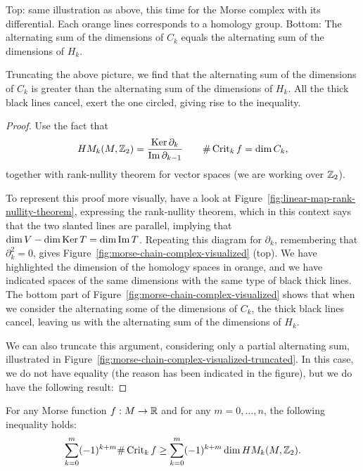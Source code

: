 \begin{marginfigure}
    \centering
    \caption{
        Top: same illustration as above, this time for the Morse complex with its differential.
        Each orange lines corresponds to a homology group.
        Bottom: The alternating sum of the dimensions of $C_k$ equals the alternating sum of the dimensions of $H_k$.
    }
    \label{fig:morse-chain-complex-visualized}
\end{marginfigure}
\begin{marginfigure}
    \centering
    \caption{Truncating the above picture, we find that the alternating sum of the dimensions of $C_k$ is greater than the alternating sum of the dimensions of  $H_k$. All the thick black lines cancel, exert the one circled, giving rise to the inequality.
    }
    \label{fig:morse-chain-complex-visualized-truncated}
\end{marginfigure}
\begin{proof}
    Use the fact that 
    \[
        \HMf[k]{M, \Z_2} = \frac{\Ker \partial_k}{\Im \partial_{k-1}} \qquad \# \Crit_k f = \dim C_k,
    \]
    together with rank-nullity theorem for vector spaces (we are working over $\Z_2$).

    To represent this proof more visually, have a look at Figure~\ref{fig:linear-map-rank-nullity-theorem}, expressing the rank-nullity theorem, which in this context says that the two slanted lines are parallel, implying that $\dim V - \dim \Ker T = \dim \Im T$.
    Repeating this diagram for $\partial_k$, remembering that  $\partial_k^2 = 0$, gives Figure~\ref{fig:morse-chain-complex-visualized} (top). We have highlighted the dimension of the homology spaces in orange, and we have indicated spaces of the same dimensions with the same type of black thick lines.
    The bottom part of Figure~\ref{fig:morse-chain-complex-visualized} shows that when we consider the alternating some of the dimensions of $C_k$, the thick black lines cancel, leaving us with the alternating sum of the dimensions of $H_k$.

    We can also truncate this argument, considering only a partial alternating sum, illustrated in Figure~\ref{fig:morse-chain-complex-visualized-truncated}.
    In this case, we do not have equality (the reason has been indicated in the figure), but we do have the following result:
\end{proof}
\begin{theorem}
    For any Morse function $f: M \to  \R$ and for any $m = 0, \ldots, n$, the following inequality holds:
    \[
        \sum_{k=0}^{m} (-1)^{k+m} \# \Crit_k f \ge  \sum_{k=0}^{m} (-1)^{k+m} \dim \HMf[k]{M, \Z_2}
    .\] 
\end{theorem}


